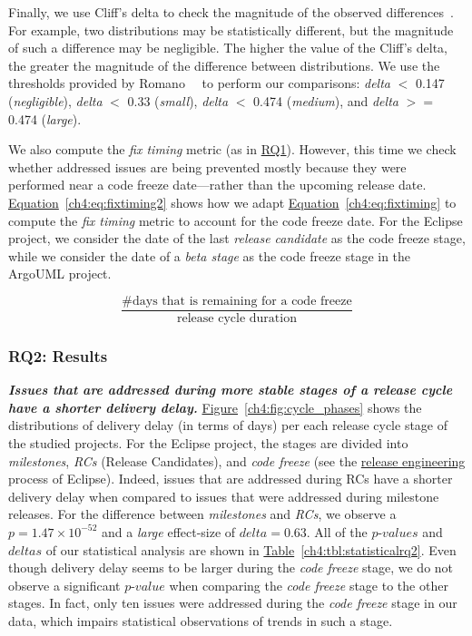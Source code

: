 Finally, we use Cliff's delta to check the magnitude of the observed
differences~\cite{cliff1993dominance}. For example, two distributions may be
statistically different, but the magnitude of such a difference may be
negligible. The higher the value of the Cliff's delta, the greater the magnitude
of the difference between distributions. We use the thresholds provided by
Romano~\etal~\cite{romano_2006} to perform our comparisons: {\em delta} $<$
0.147 ({\em negligible}), {\em delta} $<$ 0.33 ({\em small}), {\em delta} $<$
0.474 ({\em medium}), and {\em delta} $>=$ 0.474 ({\em large}).

We also compute the {\em fix timing} metric (as in \hyperref[ch4:rq1]{RQ1}).
However, this time we check whether addressed issues are being prevented mostly
because they were performed near a code freeze date---rather than the upcoming
release date. \hyperref[ch4:eq:fixtiming2]{Equation}~\ref{ch4:eq:fixtiming2} shows how
we adapt \hyperref[ch4:eq:fixtiming]{Equation}~\ref{ch4:eq:fixtiming} to compute the
{\em fix timing} metric to account for the code freeze date. For the Eclipse
project, we consider the date of the last {\em release candidate} as the code
freeze stage, while we consider the date of a {\em beta stage} as the code
freeze stage in the ArgoUML project.

\begin{equation}
	\frac{\text{\# days that is remaining for a code freeze}}{\text{release
	cycle duration}}
	\label{ch4:eq:fixtiming2}
\end{equation}

\subsubsection*{RQ2: Results}

\noindent\textit{\textbf{Issues that are addressed during more stable stages of a
release cycle have a shorter delivery delay.}}
\hyperref[ch4:fig:cycle_phases]{Figure}~\ref{ch4:fig:cycle_phases} shows the
distributions of delivery delay (in terms of days) per each release cycle
stage of the studied projects. For the Eclipse project, the stages are divided
into {\em milestones}, {\em RCs} (Release Candidates), and {\em code freeze}
(see the \hyperref[eclipse:releng]{release engineering} process of Eclipse). Indeed, issues that
are addressed during RCs have a shorter delivery delay when
compared to issues that were addressed during milestone releases. For the difference
between {\em milestones} and {\em RCs}, we observe a $p=1.47 \times 10^{-52}$ and a {\em
large} effect-size of $delta=0.63$. All of the $p$-$values$ and $deltas$ of our
statistical analysis are shown in
\hyperref[ch4:tbl:statisticalrq2]{Table}~\ref{ch4:tbl:statisticalrq2}. Even though
delivery delay seems to be larger during the {\em code freeze} stage, we do
not observe a significant $p$-$value$ when comparing the {\em code freeze} stage
to the other stages. In fact, only ten issues were addressed during the {\em code freeze}
stage in our data, which impairs statistical observations of trends in such a stage.

